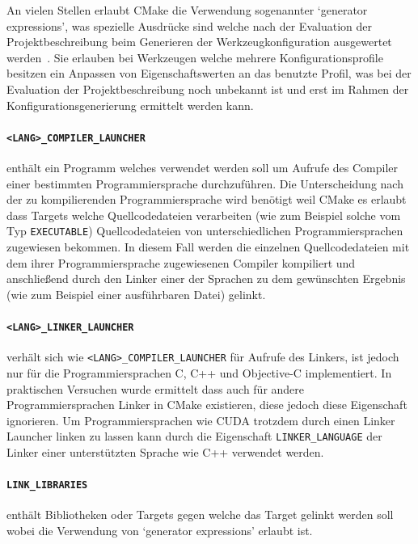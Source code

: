 \documentclass[german,proseminar,hyperref,utf8,lof]{zihpub}
\begin{document}
    An vielen Stellen erlaubt CMake die Verwendung sogenannter `generator expressions', was spezielle
    Ausdrücke sind welche nach der Evaluation der Projektbeschreibung beim Generieren der Werkzeugkonfiguration
    ausgewertet werden~.
    Sie erlauben bei Werkzeugen welche mehrere Konfigurationsprofile besitzen ein Anpassen von
    Eigenschaftswerten an das benutzte Profil, was bei der Evaluation der Projektbeschreibung
    noch unbekannt ist und erst im Rahmen der Konfigurationsgenerierung ermittelt werden kann.

    \paragraph{\texttt{<LANG>\_COMPILER\_LAUNCHER}} enthält ein Programm welches verwendet werden soll um
    Aufrufe des Compiler einer bestimmten Programmiersprache durchzuführen.
    Die Unterscheidung nach der zu kompilierenden Programmiersprache wird benötigt weil CMake es erlaubt
    dass Targets welche Quellcodedateien verarbeiten (wie zum Beispiel solche vom Typ \texttt{EXECUTABLE})
    Quellcodedateien von unterschiedlichen Programmiersprachen zugewiesen bekommen.
    In diesem Fall werden die einzelnen Quellcodedateien mit dem ihrer Programmiersprache zugewiesenen
    Compiler kompiliert und anschlie{\ss}end durch den Linker einer der Sprachen zu dem gewünschten Ergebnis
    (wie zum Beispiel einer ausführbaren Datei) gelinkt.

    \paragraph{\texttt{<LANG>\_LINKER\_LAUNCHER}} verhält sich wie \texttt{<LANG>\_COMPILER\_LAUNCHER}
    für Aufrufe des Linkers, ist jedoch nur für die Programmiersprachen C, C++ und Objective-C implementiert.
    In praktischen Versuchen wurde ermittelt dass auch für andere Programmiersprachen Linker in CMake
    existieren, diese jedoch diese Eigenschaft ignorieren.
    Um Programmiersprachen wie CUDA trotzdem durch einen Linker Launcher linken zu lassen kann durch die
    Eigenschaft \texttt{LINKER\_LANGUAGE} der Linker einer unterstützten Sprache wie C++ verwendet werden.

    \paragraph{\texttt{LINK\_LIBRARIES}} enthält Bibliotheken oder Targets gegen welche das Target gelinkt
    werden soll wobei die Verwendung von `generator expressions' erlaubt ist.
\end{document}

